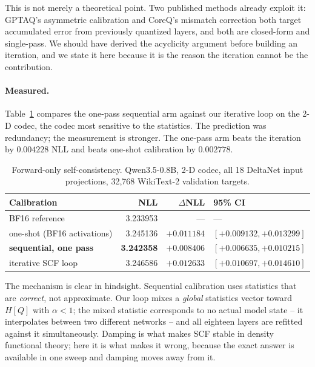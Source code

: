 This is not merely a theoretical point. Two published methods already exploit
it: GPTAQ's asymmetric calibration \cite{gptaq} and CoreQ's mismatch correction
\cite{coreq} both target accumulated error from previously quantized layers, and
both are closed-form and single-pass. We should have derived the acyclicity
argument before building an iteration, and we state it here because it is the
reason the iteration cannot be the contribution.

\paragraph{Measured.} Table~\ref{tab:phase0a} compares the one-pass sequential
arm against our iterative loop on the 2-D codec, the codec most sensitive to the
statistics. The prediction was redundancy; the measurement is stronger. The
one-pass arm beats the iteration by $0.004228$ NLL and beats one-shot
calibration by $0.002778$.

\begin{table}[ht]
\centering\small
\caption{Forward-only self-consistency. Qwen3.5-0.8B, 2-D codec, all 18 DeltaNet
input projections, 32{,}768 WikiText-2 validation targets.}
\label{tab:phase0a}
\begin{tabular}{lrrl}\toprule
Calibration & NLL & $\Delta$NLL & 95\% CI\\\midrule
BF16 reference & 3.233953 & --- & ---\\
one-shot (BF16 activations) & 3.245136 & $+0.011184$ & $[+0.009132,+0.013299]$\\
\textbf{sequential, one pass} & \textbf{3.242358} & $\mathbf{+0.008406}$ & $[+0.006635,+0.010215]$\\
iterative SCF loop & 3.246586 & $+0.012633$ & $[+0.010697,+0.014610]$\\\bottomrule
\end{tabular}
\end{table}

The mechanism is clear in hindsight. Sequential calibration uses statistics that
are \emph{correct}, not approximate. Our loop mixes a \emph{global} statistics
vector toward $H[Q]$ with $\alpha<1$; the mixed statistic corresponds to no
actual model state -- it interpolates between two different networks -- and all
eighteen layers are refitted against it simultaneously. Damping is what makes
SCF stable in density functional theory; here it is what makes it wrong, because
the exact answer is available in one sweep and damping moves away from it.

